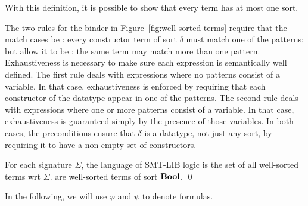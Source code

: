 With this definition, it is possible to show that every term has at
most one sort.

\begin{remark}
The two rules for the  binder in Figure~\ref{fig:well-sorted-terms} 
require that the match cases be :
every constructor term of sort $\delta$ must match one of the patterns;
but allow it to be :
the same term may match more than one pattern.
Exhaustiveness is necessary to make sure each  expression is
semantically well defined.
The first rule deals with  expressions where no patterns consist 
of a variable.
In that case, exhaustiveness is enforced by requiring that each constructor
of the datatype appear in one of the patterns.
The second rule deals with  expressions where one or more patterns 
consist of a variable.
In that case, exhaustiveness is guaranteed simply by the presence 
of those variables.
In both cases, the preconditions ensure that $\delta$ is a datatype, 
not just any sort, by requiring it to have a non-empty set of constructors.
\end{remark}


\begin{definition}
For each signature $\Sigma$,
the language of SMT-LIB logic is the set of all well-sorted terms
wrt $\Sigma$.
 are well-sorted terms of sort $\textbf{Bool}$.
\qed
\end{definition}

In the following, we will use $\varphi$ and $\psi$ to denote formulas.
\medskip

